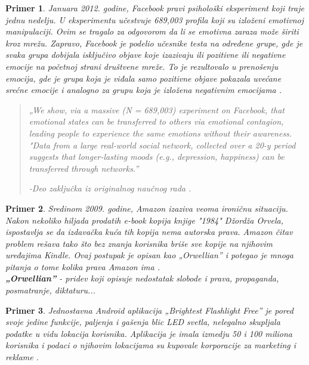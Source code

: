 \documentclass[a4paper]{article}
\newtheorem{primer}{Primer}[section]
\begin{document}
\begin{primer}
Januara 2012. godine, Facebook pravi psihološki eksperiment koji traje jednu nedelju. U eksperimentu učestvuje 689,003 profila koji su izloženi emotivnoj manipulaciji. Ovim se tragalo za odgovorom da li se emotivna zaraza može širiti kroz mrežu. Zapravo, Facebook je podelio učesnike testa na određene grupe, gde je svaka grupa dobijala isključivo objave koje izazivaju ili pozitivne ili negativne emocije na početnoj strani društvene mreže. To je rezultovalo u prenošenju emocija, gde je grupa koja je viđala samo pozitivne objave pokazala uvećane srećne emocije i analogno 	za grupu koja je izložena negativnim emocijama \cite{facebookExperiment}.
\begin{quotation}
\textit{„We show, via a massive (N = 689,003) experiment on Facebook, that emotional states can be transferred to others via emotional contagion, leading people to experience the same emotions without their awareness.
"Data from a large real-world social network, collected over a 20-y period suggests that longer-lasting moods (e.g., depression, happiness) can be transferred through networks.”}
\begin{flushright}
-\em{Deo zaključka iz originalnog naučnog rada \cite{facebookExperiment}.}
\end{flushright}
\end{quotation}
\end{primer}

\begin{primer}
Sredinom 2009. godine, Amazon izaziva veoma ironičnu situaciju. Nakon nekoliko hiljada prodatih e-book kopija knjige "1984" Džordža Orvela, ispostavlja se da izdavačka kuća tih kopija nema autorska prava. Amazon čitav problem rešava tako što bez znanja korisnika briše sve kopije na njihovim uređajima Kindle. Ovaj postupak je opisan kao „Orwellian” i potegao je mnoga pitanja o tome kolika prava Amazon ima \cite{dataAndGoliath}.
\\\textbf{„Orwellian”} - \textit{pridev koji opisuje nedostatak slobode i prava, propaganda, posmatranje, diktaturu...}\\
\end{primer}

\begin{primer}
Jednostavna Android aplikacija „Brightest Flashlight 
Free” je pored svoje jedine funkcije, paljenja i gašenja blic LED svetla, nelegalno skupljala podatke u vidu lokacija korisnika. Aplikacija je imala izmedju 50 i 100 miliona korisnika i podaci o njihovim lokacijama su kupovale korporacije za marketing i reklame \cite{dataAndGoliath}\cite{flashlightApp}.\\
\end{primer}
\end{document}
